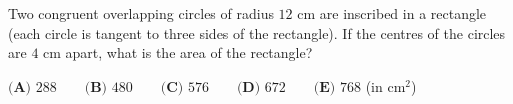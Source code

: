 Two congruent overlapping circles of radius $12$ cm are inscribed in a rectangle (each circle is tangent to three sides of the rectangle). If the centres of the circles are $4$ cm apart, what is the area of the rectangle?

$\textbf{(A) }288\qquad\textbf{(B) }480\qquad\textbf{(C) }576\qquad\textbf{(D) }672\qquad\textbf{(E) }768$ (in cm$^2$)
